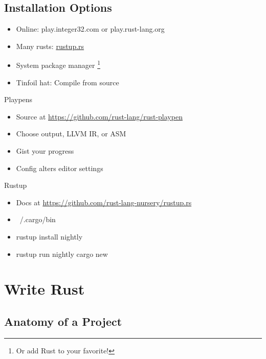 \documentclass[xcolor={svgnames},hyperref]{beamer}
\begin{document}
    \subsection{Installation Options}

    \begin{frame}
        \begin{itemize}
            \item Online: play.integer32.com or play.rust-lang.org
            \item Many rusts: \url{rustup.rs}
            \item System package manager \footnote{Or add Rust to your favorite!}
            \item Tinfoil hat: Compile from source
        \end{itemize}
    \end{frame}

    \begin{frame}
        Playpens
        \begin{itemize}
            \item Source at \url{https://github.com/rust-lang/rust-playpen}
            \item Choose output, LLVM IR, or ASM
            \item Gist your progress
            \item Config alters editor settings
        \end{itemize}
    \end{frame}

    \begin{frame}
        Rustup
        \begin{itemize}
            \item Docs at \url{https://github.com/rust-lang-nursery/rustup.rs}
            \item ~/.cargo/bin
            \item rustup install nightly
            \item rustup run nightly cargo new
        \end{itemize}
    \end{frame}

\section{Write Rust}

\subsection{Anatomy of a Project}
\end{document}
